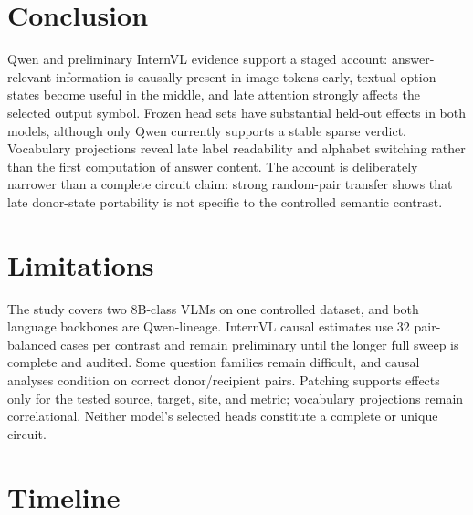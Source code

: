 \documentclass[11pt]{article}
\begin{document}
\section{Conclusion}

Qwen and preliminary InternVL evidence support a staged account:
answer-relevant information is causally present in image tokens early,
textual option states become useful in the middle, and late attention strongly
affects the selected output symbol. Frozen head sets have substantial held-out
effects in both models, although only Qwen currently supports a stable sparse
verdict. Vocabulary projections reveal late label readability and alphabet
switching rather than the first computation of answer content. The account is
deliberately narrower than a complete circuit claim: strong random-pair
transfer shows that late donor-state portability is not specific to the
controlled semantic contrast.

\section*{Limitations}

The study covers two 8B-class VLMs on one controlled dataset, and both language
backbones are Qwen-lineage. InternVL causal estimates use 32 pair-balanced
cases per contrast and remain preliminary until the longer full sweep is
complete and audited. Some question families remain difficult, and causal
analyses condition on correct donor/recipient pairs. Patching supports effects
only for the tested source, target, site, and metric; vocabulary projections
remain correlational. Neither model's selected heads constitute a complete or
unique circuit.

\section{Timeline}
\end{document}
